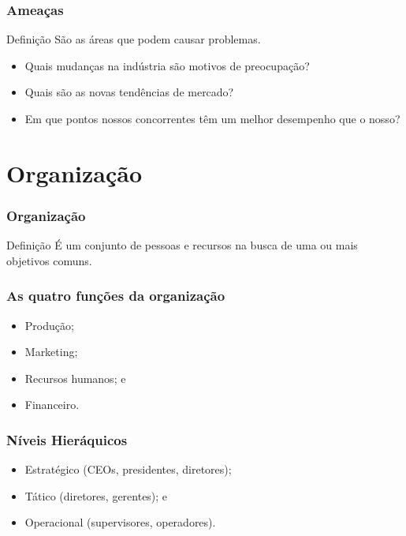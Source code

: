 \documentclass[aspectratio=169]{beamer}
\begin{document}
\begin{frame}
	\frametitle{Amea\c cas}

	\begin{block}{Defini\c cão}
		São as áreas que podem causar problemas.
	\end{block}\vfill
	
	\begin{itemize}
		\item Quais mudanças na indústria são motivos de preocupação?
		\item Quais são as novas tendências de mercado?
		\item Em que pontos nossos concorrentes têm um melhor desempenho que o nosso?
	\end{itemize}
\end{frame}

\section{Organiza\c cão}

\begin{frame}
	\frametitle{Organiza\c cão}

	\begin{block}{Defini\c cão}
		É um conjunto de pessoas e recursos na busca de uma ou mais objetivos comuns.
	\end{block}
\end{frame}

\begin{frame}
	\frametitle{As quatro fun\c cões da organiza\c cão}

	\begin{itemize}
		\item Produ\c cão;
		\item Marketing;
		\item Recursos humanos; e
		\item Financeiro.
	\end{itemize}
\end{frame}

\begin{frame}
	\frametitle{Níveis Hieráquicos}

	\begin{itemize}
		\item Estratégico (CEOs, presidentes, diretores);
		\item Tático (diretores, gerentes); e
		\item Operacional (supervisores, operadores).
	\end{itemize}
\end{frame}
\end{document}
